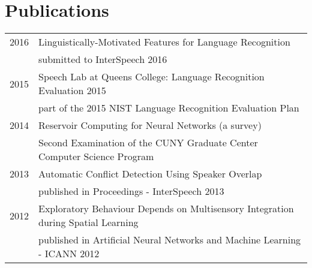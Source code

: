 \documentclass[a4paper,10pt]{article}
\begin{document}
%


\section{Publications}
\begin{tabular}{rl}
\textsc{ \hspace{2.3cm} 2016} & Linguistically-Motivated Features for Language Recognition\\
& submitted to InterSpeech 2016 \\
\textsc{2015} & Speech Lab at Queens College: Language Recognition Evaluation 2015 \\
& part of the 2015 NIST Language Recognition Evaluation Plan\\
\textsc{2014} & Reservoir Computing for Neural Networks (a survey) \\
& Second Examination of the CUNY Graduate Center Computer Science Program\\
\textsc{2013} & Automatic Conflict Detection Using Speaker Overlap\\
& published in Proceedings - InterSpeech 2013\\
\textsc{2012} & Exploratory Behaviour Depends on Multisensory Integration during Spatial Learning\\
& published in Artificial Neural Networks and Machine Learning - ICANN 2012
\end{tabular}\\
\end{document}

